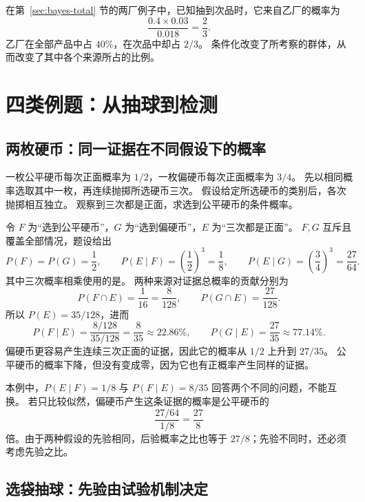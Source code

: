 \documentclass[UTF8]{ctexart}
\begin{document}
在第~\ref{sec:bayes-total} 节的两厂例子中，已知抽到次品时，它来自乙厂的概率为
\[
  \frac{0.4\times0.03}{0.018}=\frac23.
\]
乙厂在全部产品中占 $40\%$，在次品中却占 $2/3$。
条件化改变了所考察的群体，从而改变了其中各个来源所占的比例。

\section{四类例题：从抽球到检测}
\label{sec:bayes-examples}

\subsection{两枚硬币：同一证据在不同假设下的概率}

\begin{example}[连续三次正面之后的硬币类别]
\label{ex:bayes-coins}
一枚公平硬币每次正面概率为 $1/2$，一枚偏硬币每次正面概率为 $3/4$。
先以相同概率选取其中一枚，再连续抛掷所选硬币三次。
假设给定所选硬币的类别后，各次抛掷相互独立。
观察到三次都是正面，求选到公平硬币的条件概率。
\end{example}
\begin{solve}
令 $F$ 为“选到公平硬币”，$G$ 为“选到偏硬币”，$E$ 为“三次都是正面”。
$F,G$ 互斥且覆盖全部情况，题设给出
\[
  P(F)=P(G)=\frac12,\qquad
  P(E\mid F)=\left(\frac12\right)^3=\frac18,\qquad
  P(E\mid G)=\left(\frac34\right)^3=\frac{27}{64}.
\]
其中三次概率相乘使用的是。
两种来源对证据总概率的贡献分别为
\[
  P(F\cap E)=\frac1{16}=\frac8{128},\qquad
  P(G\cap E)=\frac{27}{128}.
\]
所以 $P(E)=35/128$，进而
\begin{equation}
  P(F\mid E)=\frac{8/128}{35/128}=\frac8{35}\approx22.86\%,
  \qquad
  P(G\mid E)=\frac{27}{35}\approx77.14\%.
  \label{eq:bayes-coins-result}
\end{equation}
偏硬币更容易产生连续三次正面的证据，因此它的概率从 $1/2$ 上升到 $27/35$。
公平硬币的概率下降，但没有变成零，因为它也有正概率产生同样的证据。
\end{solve}

本例中，$P(E\mid F)=1/8$ 与 $P(F\mid E)=8/35$ 回答两个不同的问题，不能互换。
若只比较似然，偏硬币产生这条证据的概率是公平硬币的
\[
  \frac{27/64}{1/8}=\frac{27}{8}
\]
倍。由于两种假设的先验相同，后验概率之比也等于 $27/8$；先验不同时，还必须考虑先验之比。

\subsection{选袋抽球：先验由试验机制决定}
\end{document}
